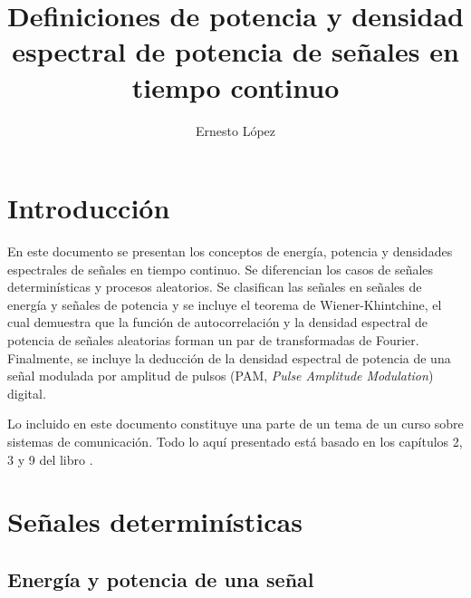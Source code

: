 \documentclass[a4paper]{article}
\title{Definiciones de potencia y densidad espectral de potencia de señales en tiempo continuo}
\author{Ernesto López}
\begin{document}
 

\maketitle

\section{Introducción}

En este documento se presentan los conceptos de energía, potencia y densidades espectrales de señales en tiempo continuo. Se diferencian los casos de señales determinísticas y procesos aleatorios. Se clasifican las señales en señales de energía y señales de potencia y se incluye el teorema de Wiener-Khintchine, el cual demuestra que la función de autocorrelación y la densidad espectral de potencia de señales aleatorias forman un par de transformadas de Fourier. Finalmente, se incluye la deducción de la densidad espectral de potencia de una señal modulada por amplitud de pulsos (PAM, \emph{Pulse Amplitude Modulation}) digital.

Lo incluido en este documento constituye una parte de un tema de un curso sobre sistemas de comunicación. Todo lo aquí presentado está basado en los capítulos 2, 3 y 9 del libro \cite{lathi1990modern4th}.

\section{Señales determinísticas}

\subsection{Energía y potencia de una señal}\label{sec:signal_energy_and_power_definition}
\end{document}
